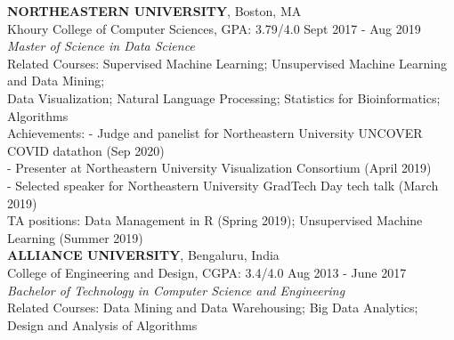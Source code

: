 \documentclass[a4paper]{article}
\newcommand{\myline}{\par
  \kern2pt %
  \hrule height 0.5pt
  \kern2pt %
}
\begin{document}
	\noindent
	\textbf{NORTHEASTERN UNIVERSITY}, Boston, MA \\
	Khoury College of Computer Sciences, GPA: 3.79/4.0 
        \hfill Sept 2017 - Aug 2019 \\
	\textit{Master of Science in Data Science} \\
        Related Courses: Supervised Machine Learning; 
        Unsupervised Machine Learning and Data Mining; \\
        \hspace*{23.9mm} Data Visualization;
        Natural Language Processing;
        Statistics for Bioinformatics; Algorithms \\
  Achievements: - Judge and panelist for Northeastern University UNCOVER COVID datathon (Sep 2020) \\
  \hspace*{21.2mm} - Presenter at Northeastern University Visualization Consortium (April 2019)\\ %
  \hspace*{21.2mm} - Selected speaker for Northeastern University GradTech Day tech talk (March 2019) \\%
  TA positions: Data Management in R (Spring 2019); Unsupervised Machine Learning (Summer 2019) \\

 	\noindent
	\textbf{ALLIANCE UNIVERSITY}, Bengaluru, India \\
  College of Engineering and Design, CGPA: 3.4/4.0 \hfill Aug 2013 - June 2017 \\
	\textit{Bachelor of Technology in Computer Science and Engineering} \\
  Related Courses: Data Mining and Data Warehousing; Big Data Analytics; Design and Analysis of Algorithms \\

	
	
\end{document}
